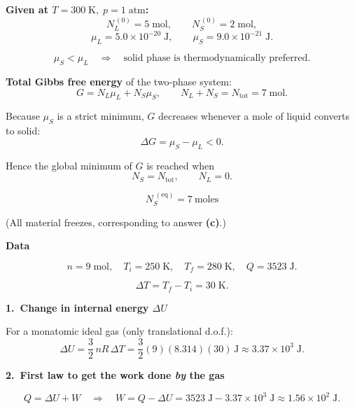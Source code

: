 \documentclass[12pt]{article}
\title{}
\author{Jerich Lee}
\date{\today}
\theoremstyle{definition} %
\theoremstyle{plain} %
\begin{document}
\maketitle


\textbf{Given at \(T=300\;\text{K},\;p=1\;\text{atm}\):}
\[
N_L^{\,(0)} = 5\;\text{mol},\qquad
N_S^{\,(0)} = 2\;\text{mol},
\]
\[
\mu_L = 5.0\times10^{-20}\;\text{J},\qquad
\mu_S = 9.0\times10^{-21}\;\text{J}.
\]

\[
\mu_S < \mu_L
\quad\Longrightarrow\quad
\text{solid phase is thermodynamically preferred.}
\]

\bigskip
\textbf{Total Gibbs free energy} of the two‑phase system:
\[
G = N_L\mu_L + N_S\mu_S,
\qquad N_L+N_S = N_{\text{tot}} = 7\;\text{mol}.
\]

Because \(\mu_S\) is a strict minimum, \(G\) decreases whenever a mole
of liquid converts to solid:
\[
\Delta G = \mu_S - \mu_L < 0.
\]

Hence the global minimum of \(G\) is reached when
\[
N_S = N_{\text{tot}},\qquad N_L = 0.
\]

\bigskip
\[
\boxed{N_S^{\;(\text{eq})} = 7\ \text{moles}}
\]

(All material freezes, corresponding to answer \textbf{(c)}.)

\textbf{Data}

\[
n = 9\;\text{mol},\quad
T_i = 250\;\text{K},\quad
T_f = 280\;\text{K},\quad
Q = 3523\;\text{J}.
\]

\[
\Delta T = T_f - T_i = 30\;\text{K}.
\]

\textbf{1.\ Change in internal energy \(\Delta U\)}

For a monatomic ideal gas (only translational d.o.f.):
\[
\Delta U = \frac{3}{2}\,nR\,\Delta T
         = \frac32(9)(8.314)(30)\,\text{J}
         \approx 3.37\times10^{3}\;\text{J}.
\]

\textbf{2.\ First law to get the work done \emph{by} the gas}

\[
Q = \Delta U + W
\quad\Longrightarrow\quad
W = Q - \Delta U
  = 3523\;\text{J} - 3.37\times10^{3}\;\text{J}
  \approx 1.56\times10^{2}\;\text{J}.
\]
\end{document}
